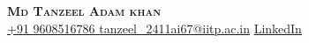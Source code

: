 \begin{center}
    \textbf{\Huge \scshape  Md Tanzeel Adam khan} \\ \vspace{1pt} 
    \href{tel:9608516786}{+91 9608516786 } \quad
    \href{mailto:tanzeel_2411ai67@iitp.ac.in}{ tanzeel_2411ai67@iitp.ac.in} \quad
    \href{https://www.linkedin.com/in/tanzeel-khan-a4ab76bb/}{\seticon{\faLinkedin } LinkedIn}
    
\end{center}